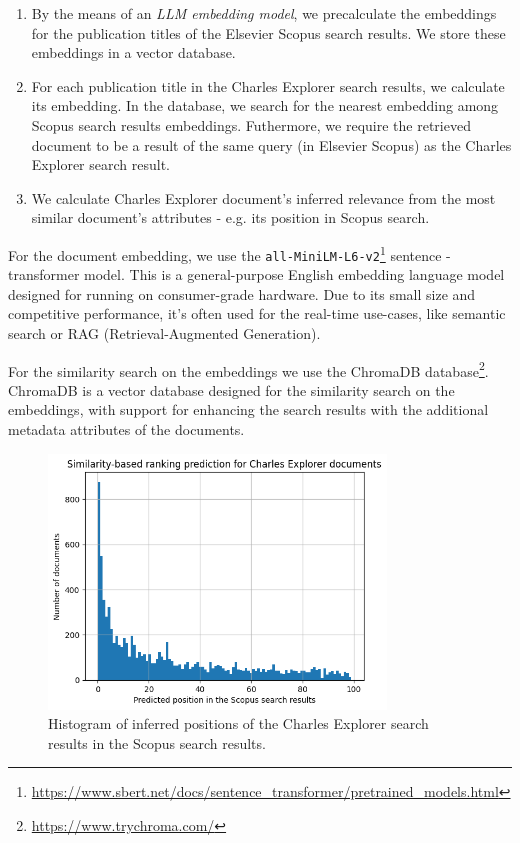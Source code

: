 \begin{enumerate}
    \item By the means of an \textit{LLM embedding model}, we precalculate the embeddings for the publication titles of the Elsevier Scopus search results. 
    We store these embeddings in a vector database.
    \item For each publication title in the Charles Explorer search results, we calculate its embedding. 
    In the database, we search for the nearest embedding among Scopus search results embeddings. 
    Futhermore, we require the retrieved document to be a result of the same query (in Elsevier Scopus) as the Charles Explorer search result.
    \item We calculate Charles Explorer document’s inferred relevance from the most similar document’s attributes - e.g. its position in Scopus search.
\end{enumerate}

For the document embedding, we use the \texttt{all-MiniLM-L6-v2}\footnote{\url{https://www.sbert.net/docs/sentence_transformer/pretrained_models.html}} sentence - transformer model. 
This is a general-purpose English embedding language model designed for running on consumer-grade hardware. 
Due to its small size and competitive performance, it’s often used for the real-time use-cases, like semantic search or RAG (Retrieval-Augmented Generation).

For the similarity search on the embeddings we use the ChromaDB database\footnote{\url{https://www.trychroma.com/}}. 
ChromaDB is a vector database designed for the similarity search on the embeddings, with support
for enhancing the search results with the additional metadata attributes of the documents.

\begin{figure}[ht!]
    \captionsetup{width=.9\linewidth}
    \includegraphics[width=0.8\textwidth]{../img/llm-embedding-positions-hist.png}
    \centering
    \caption{Histogram of inferred positions of the Charles Explorer search results in the Scopus search results.}
\end{figure}

